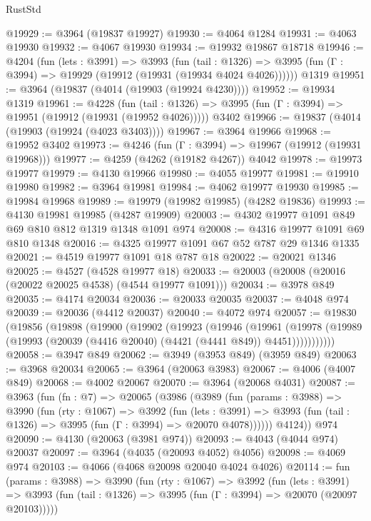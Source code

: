 \begin{lexlean}{RustStd}
\begin{coremodule}
@19929 := @3964 (@19837 @19927)
@19930 := @4064 @1284
@19931 := @4063 @19930
@19932 := @4067 @19930
@19934 := @19932 @19867 @18718
@19946 := @4204
    (fun (lets : @3991) =>
    @3993
      (fun (tail : @1326) =>
      @3995 (fun (Γ : @3994) => @19929 (@19912 (@19931 (@19934 @4024 @4026))))))
    @1319
@19951 := @3964 (@19837 (@4014 (@19903 (@19924 @4230))))
@19952 := @19934 @1319
@19961 := @4228
    (fun (tail : @1326) => @3995 (fun (Γ : @3994) => @19951 (@19912 (@19931 (@19952 @4026)))))
    @3402
@19966 := @19837 (@4014 (@19903 (@19924 (@4023 @3403))))
@19967 := @3964 @19966
@19968 := @19952 @3402
@19973 := @4246 (fun (Γ : @3994) => @19967 (@19912 (@19931 @19968)))
@19977 := @4259 (@4262 (@19182 @4267)) @4042
@19978 := @19973 @19977
@19979 := @4130 @19966
@19980 := @4055 @19977
@19981 := @19910 @19980
@19982 := @3964 @19981
@19984 := @4062 @19977 @19930
@19985 := @19984 @19968
@19989 := @19979 (@19982 @19985) (@4282 @19836)
@19993 := @4130 @19981 @19985 (@4287 @19909)
@20003 := @4302 @19977 @1091 @849 @69 @810 @812 @1319 @1348 @1091 @974
@20008 := @4316 @19977 @1091 @69 @810 @1348
@20016 := @4325 @19977 @1091 @67 @52 @787 @29 @1346 @1335
@20021 := @4519 @19977 @1091 @18 @787 @18
@20022 := @20021 @1346
@20025 := @4527 (@4528 @19977 @18)
@20033 := @20003 (@20008 (@20016 (@20022 @20025 @4538) (@4544 @19977 @1091)))
@20034 := @3978 @849
@20035 := @4174 @20034
@20036 := @20033 @20035
@20037 := @4048 @974
@20039 := @20036 (@4412 @20037)
@20040 := @4072 @974
@20057 := @19830
    (@19856
      (@19898
        (@19900
          (@19902
            (@19923
              (@19946
                (@19961
                  (@19978
                    (@19989 (@19993 (@20039 (@4416 @20040) (@4421 (@4441 @849)) @4451)))))))))))
@20058 := @3947 @849
@20062 := @3949 (@3953 @849) (@3959 @849)
@20063 := @3968 @20034
@20065 := @3964 (@20063 @3983)
@20067 := @4006 (@4007 @849)
@20068 := @4002 @20067
@20070 := @3964 (@20068 @4031)
@20087 := @3963
    (fun (fn : @7) =>
    @20065
      (@3986
        (@3989
          (fun (params : @3988) =>
          @3990
            (fun (rty : @1067) =>
            @3992
              (fun (lets : @3991) =>
              @3993 (fun (tail : @1326) => @3995 (fun (Γ : @3994) => @20070 @4078))))))
        @4124))
    @974
@20090 := @4130 (@20063 (@3981 @974))
@20093 := @4043 (@4044 @974) @20037
@20097 := @3964 (@4035 (@20093 @4052) @4056)
@20098 := @4069 @974
@20103 := @4066 (@4068 @20098 @20040 @4024 @4026)
@20114 := fun (params : @3988) =>
  @3990
    (fun (rty : @1067) =>
    @3992
      (fun (lets : @3991) =>
      @3993 (fun (tail : @1326) => @3995 (fun (Γ : @3994) => @20070 (@20097 @20103)))))

\end{coremodule}
\end{lexlean}
